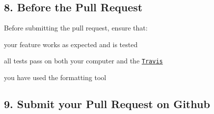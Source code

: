 \subsection*{8. Before the Pull Request}

Before submitting the pull request, ensure that\+:
\begin{DoxyItemize}
\item your feature works as expected and is tested
\item all tests pass on both your computer and the \href{travis-ci.org/Cylix/cpp_redis}{\tt Travis}
\item you have used the formatting tool
\end{DoxyItemize}

\subsection*{9. Submit your Pull Request on Github}
